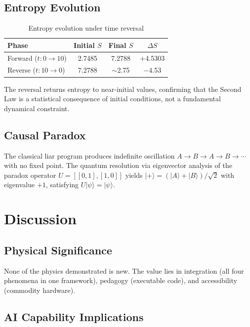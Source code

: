 \documentclass[12pt,a4paper]{article}
\begin{document}
\subsection{Entropy Evolution}

\begin{table}[H]
\centering
\caption{Entropy evolution under time reversal}
\label{tab:entropy}
\begin{tabular}{lccc}
\toprule
\textbf{Phase} & \textbf{Initial $S$} & \textbf{Final $S$} & \textbf{$\Delta S$} \\
\midrule
Forward  ($t: 0 \rightarrow 10$) & 2.7485 & 7.2788 & +4.5303 \\
Reverse  ($t: 10 \rightarrow 0$) & 7.2788 & $\sim$2.75 & $-$4.53 \\
\bottomrule
\end{tabular}
\end{table}

The reversal returns entropy to near-initial values, confirming that the Second Law is a statistical consequence of initial conditions, not a fundamental dynamical constraint.

\subsection{Causal Paradox}

The classical liar program produces indefinite oscillation $A \rightarrow B \rightarrow A \rightarrow B \rightarrow \cdots$ with no fixed point. The quantum resolution via eigenvector analysis of the paradox operator $U = [[0,1],[1,0]]$ yields $|+\rangle = (|A\rangle + |B\rangle)/\sqrt{2}$ with eigenvalue $+1$, satisfying $U|\psi\rangle = |\psi\rangle$.


\section{Discussion}

\subsection{Physical Significance}

None of the physics demonstrated is new. The value lies in integration (all four phenomena in one framework), pedagogy (executable code), and accessibility (commodity hardware).

\subsection{AI Capability Implications}
\end{document}
